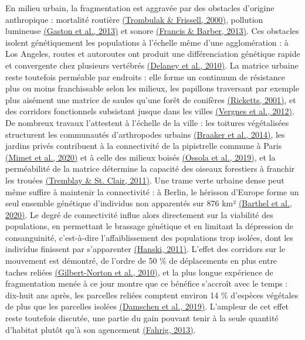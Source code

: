 \documentclass[a4paper,11pt]{report}
\begin{document}
En milieu urbain, la fragmentation est aggravée par des obstacles d'origine anthropique : mortalité routière \hyperref[sec:bibliographie]{(Trombulak \& Frissell, 2000)}, pollution lumineuse \hyperref[sec:bibliographie]{(Gaston et al., 2013)} et sonore \hyperref[sec:bibliographie]{(Francis \& Barber, 2013)}. Ces obstacles isolent génétiquement les populations à l'échelle même d'une agglomération : à Los Angeles, routes et autoroutes ont produit une différenciation génétique rapide et convergente chez plusieurs vertébrés \hyperref[sec:bibliographie]{(Delaney et al., 2010)}. La matrice urbaine reste toutefois perméable par endroits : elle forme un continuum de résistance plus ou moins franchissable selon les milieux, les papillons traversant par exemple plus aisément une matrice de saules qu'une forêt de conifères \hyperref[sec:bibliographie]{(Ricketts, 2001)}, et des corridors fonctionnels subsistant jusque dans les villes \hyperref[sec:bibliographie]{(Vergnes et al., 2012)}. De nombreux travaux l'attestent à l'échelle de la ville : les toitures végétalisées structurent les communautés d'arthropodes urbains \hyperref[sec:bibliographie]{(Braaker et al., 2014)}, les jardins privés contribuent à la connectivité de la pipistrelle commune à Paris \hyperref[sec:bibliographie]{(Mimet et al., 2020)} et à celle des milieux boisés \hyperref[sec:bibliographie]{(Ossola et al., 2019)}, et la perméabilité de la matrice détermine la capacité des oiseaux forestiers à franchir les trouées \hyperref[sec:bibliographie]{(Tremblay \& St. Clair, 2011)}. Une trame verte urbaine dense peut même suffire à maintenir la connectivité : à Berlin, le hérisson d'Europe forme un seul ensemble génétique d'individus non apparentés sur 876 km² \hyperref[sec:bibliographie]{(Barthel et al., 2020)}. Le degré de connectivité influe alors directement sur la viabilité des populations, en permettant le brassage génétique et en limitant la dépression de consanguinité, c'est-à-dire l'affaiblissement des populations trop isolées, dont les individus finissent par s'apparenter \hyperref[sec:bibliographie]{(Hanski, 2011)}. L'effet des corridors sur le mouvement est démontré, de l'ordre de 50 \% de déplacements en plus entre taches reliées \hyperref[sec:bibliographie]{(Gilbert-Norton et al., 2010)}, et la plus longue expérience de fragmentation menée à ce jour montre que ce bénéfice s'accroît avec le temps : dix-huit ans après, les parcelles reliées comptent environ 14 \% d'espèces végétales de plus que les parcelles isolées \hyperref[sec:bibliographie]{(Damschen et al., 2019)}. L'ampleur de cet effet reste toutefois discutée, une partie du gain pouvant tenir à la seule quantité d'habitat plutôt qu'à son agencement \hyperref[sec:bibliographie]{(Fahrig, 2013)}.
\end{document}
